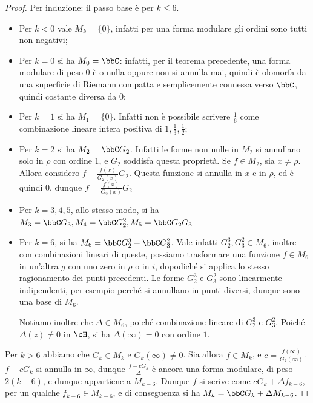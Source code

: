 \begin{proof}
	Per induzione: il passo base è per $k\leq6$.
	\begin{itemize}
		\item Per $k < 0$ vale $M_k = \{ 0 \}$, infatti per una forma modulare gli ordini sono tutti non negativi;
		
		\item Per $k = 0$ si ha $M_0 = \bbC$: infatti, per il teorema precedente, una forma modulare di peso $0$ è o nulla oppure non si annulla mai, quindi è olomorfa da una superficie di Riemann compatta e semplicemente connessa verso $\bbC$, quindi costante diversa da $0$;
		
		\item Per $k = 1$ si ha $M_1=\{0\}$. Infatti non è possibile scrivere $\frac{1}{6}$ come combinazione lineare intera positiva di $1, \frac{1}{3}, \frac{1}{2}$;
		
		\item Per $k = 2$ si ha $M_2=\bbC G_2$. Infatti le forme non nulle in $M_2$ si annullano solo in $\rho$ con ordine 1,
		e $G_2$ soddisfa questa proprietà. Se $f\in M_2$, sia $x\neq\rho$. Allora considero $f-\frac{f(x)}{G_2(x)}G_2$. Questa funzione si annulla in $x$ e in $\rho$, ed è quindi $0$, dunque $f=\frac{f(x)}{G_2(x)}G_2$
		
		\item Per $k = 3, 4, 5$, allo stesso modo, si ha $M_3=\bbC G_3, M_4=\bbC G_2^2, M_5= \bbC G_2G_3$
		
		\item Per $k = 6$, si ha $M_6 = \bbC G_2^3 + \bbC G_3^2$. Vale infatti $G_2^3, G_3^2 \in M_6$, inoltre con combinazioni lineari di queste, possiamo trasformare una funzione $f \in M_6$ in un'altra $g$ con uno zero in $\rho$ o in $i$, dopodiché si applica lo stesso ragionamento dei punti precedenti.
		Le forme $G_2^3$ e $G_3^2$ sono linearmente indipendenti, per esempio perché si annullano in punti diversi, dunque sono una base di $M_6$.
		
		Notiamo inoltre che $\Delta \in M_6$, poiché combinazione lineare di $G_2^3$ e $G_3^2$.
		Poiché $\Delta(z) \neq 0$ in $\cH$, si ha $\Delta(\infty) = 0$ con ordine $1$.
	\end{itemize}
	
	Per $k > 6$ abbiamo che $G_k \in M_k$ e $G_k(\infty) \neq 0$.
	Sia allora $f \in M_k$, e $c=\frac{f(\infty)}{G_k(\infty)}$. $f-cG_k$ si annulla in $\infty$, dunque $\frac{f-cG_k}{\Delta}$ è ancora una forma modulare, di peso $2(k-6)$, e dunque appartiene a $M_{k-6}$.
	Dunque $f$ si scrive come $cG_k+\Delta f_{k-6}$, per un qualche $f_{k-6} \in M_{k-6}$, e di conseguenza si ha $M_k=\bbC G_k + \Delta M_{k-6}$.
	

\end{proof}
